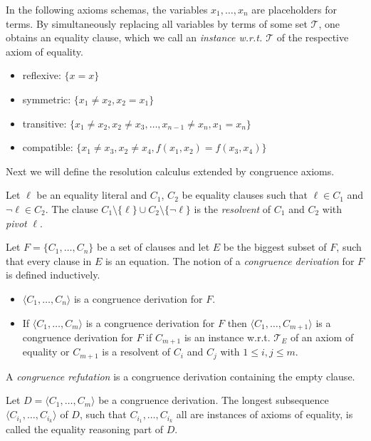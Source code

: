 \begin{definition}

In the following axioms schemas, the variables $x_1,\ldots,x_n$ are placeholders for terms.
By simultaneously replacing all variables by terms of some set $\mathcal{T}$, one obtains an equality clause, which we call an \emph{instance w.r.t. $\mathcal{T}$} of the respective axiom of equality.

\begin{itemize}
	\item reflexive: $\{x = x\}$
	\item symmetric: $\{x_1 \neq x_2, x_2 = x_1\}$
	\item transitive: $\{x_1 \neq x_2, x_2 \neq x_3, \ldots, x_{n-1} \neq x_n, x_1 = x_n\}$
	\item compatible: $\{x_1 \neq x_3, x_2 \neq x_4, f(x_1,x_2) = f(x_3,x_4)\}$
\end{itemize}

\end{definition}

Next we will define the resolution calculus extended by congruence axioms.

\begin{definition}

Let $\ell$ be an equality literal and $C_1$, $C_2$ be equality clauses such that $\ell \in C_1$ and $\neg \ell \in C_2$.
The clause $C_1 \setminus \{\ell\} \cup C_2 \setminus \{\neg \ell\}$ is the \emph{resolvent} of $C_1$ and $C_2$ with \emph{pivot} $\ell$.

\noindent Let $F = \{C_1, \ldots, C_n\}$ be a set of clauses and let $E$ be the biggest subset of $F$, such that every clause in $E$ is an equation.
The notion of a \emph{congruence derivation} for $F$ is defined inductively.
\begin{itemize}
	\item $\langle C_1, \ldots, C_n\rangle$ is a congruence derivation for $F$.
	\item If $\langle C_1, \ldots, C_m\rangle$ is a congruence derivation for $F$ then $\langle C_1, \ldots, C_{m+1} \rangle$ is a congruence derivation for $F$ if $C_{m+1}$ is an instance w.r.t. $\mathcal{T}_E$ of an axiom of equality or $C_{m+1}$ is a resolvent of $C_i$ and $C_j$ with $1 \leq i,j \leq m$.
\end{itemize}
A \emph{congruence refutation} is a congruence derivation containing the empty clause.

\noindent Let $D = \langle C_1, \ldots, C_m\rangle$ be a congruence derivation.
The longest subsequence $\langle C_{i_1}, \ldots, C_{i_k}\rangle$ of $D$, such that $C_{i_1}, \ldots, C_{i_k}$ all are instances of axioms of equality, is called the equality reasoning part of $D$.

\end{definition}

